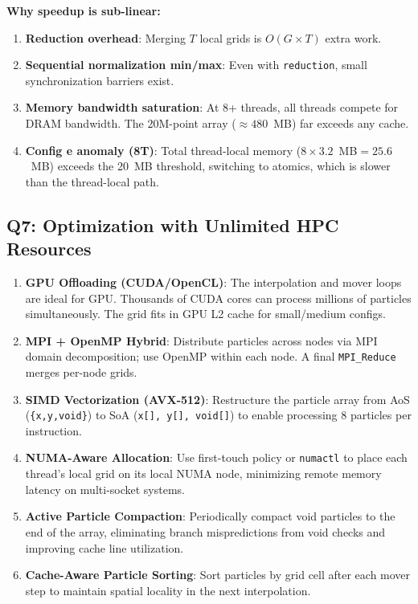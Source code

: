 \documentclass[12pt,a4paper]{article}
\begin{document}
\textbf{Why speedup is sub-linear:}
\begin{enumerate}
    \item \textbf{Reduction overhead}: Merging $T$ local grids is $O(G \times T)$ extra
          work.
    \item \textbf{Sequential normalization min/max}: Even with \texttt{reduction}, small
          synchronization barriers exist.
    \item \textbf{Memory bandwidth saturation}: At 8+ threads, all threads compete for
          DRAM bandwidth. The 20M-point array ($\approx\!480$~MB) far exceeds any cache.
    \item \textbf{Config e anomaly (8T)}: Total thread-local memory ($8\times3.2$~MB$=
          25.6$~MB) exceeds the 20~MB threshold, switching to atomics, which is slower
          than the thread-local path.
\end{enumerate}

\subsection{Q7: Optimization with Unlimited HPC Resources}

\begin{enumerate}
    \item \textbf{GPU Offloading (CUDA/OpenCL)}: The interpolation and mover loops are
          ideal for GPU. Thousands of CUDA cores can process millions of particles
          simultaneously. The grid fits in GPU L2 cache for small/medium configs.
    \item \textbf{MPI + OpenMP Hybrid}: Distribute particles across nodes via MPI domain
          decomposition; use OpenMP within each node. A final \texttt{MPI\_Reduce} merges
          per-node grids.
    \item \textbf{SIMD Vectorization (AVX-512)}: Restructure the particle array from
          AoS (\texttt{\{x,y,void\}}) to SoA (\texttt{x[], y[], void[]}) to enable
          processing 8 particles per instruction.
    \item \textbf{NUMA-Aware Allocation}: Use first-touch policy or \texttt{numactl} to
          place each thread's local grid on its local NUMA node, minimizing remote memory
          latency on multi-socket systems.
    \item \textbf{Active Particle Compaction}: Periodically compact void particles to the
          end of the array, eliminating branch mispredictions from void checks and
          improving cache line utilization.
    \item \textbf{Cache-Aware Particle Sorting}: Sort particles by grid cell after each
          mover step to maintain spatial locality in the next interpolation.
\end{enumerate}
\end{document}

